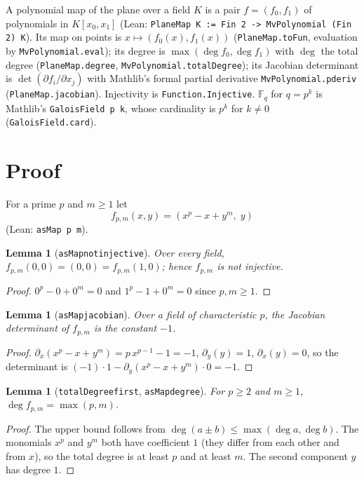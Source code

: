\documentclass[11pt]{article}
\renewcommand{\_}{\oldus\allowbreak}
\newtheorem{lemma}[theorem]{Lemma}
\theoremstyle{definition}
\theoremstyle{remark}
\newcommand{\F}{\mathbb{F}}
\begin{document}
A polynomial map of the plane over a field $K$ is a pair $f=(f_0,f_1)$ of polynomials in
$K[x_0,x_1]$ (Lean: \texttt{PlaneMap K := Fin 2 -> MvPolynomial (Fin 2) K}). Its map on points is
$x\mapsto(f_0(x),f_1(x))$ (\texttt{PlaneMap.toFun}, evaluation by \texttt{MvPolynomial.eval}); its
degree is $\max(\deg f_0,\deg f_1)$ with $\deg$ the total degree (\texttt{PlaneMap.degree},
\texttt{MvPolynomial.totalDegree}); its Jacobian determinant is
$\det(\partial f_i/\partial x_j)$ with Mathlib's formal partial derivative
\texttt{MvPolynomial.pderiv} (\texttt{PlaneMap.jacobian}). Injectivity is
\texttt{Function.Injective}. $\F_q$ for $q=p^k$ is Mathlib's \texttt{GaloisField p k}, whose
cardinality is $p^k$ for $k\ne0$ (\texttt{GaloisField.card}).

\section{Proof}

For a prime $p$ and $m\ge1$ let
\[
  f_{p,m}(x,y) = (x^p - x + y^m,\; y)
\]
(Lean: \texttt{asMap p m}).

\begin{lemma}[\texttt{asMap\_not\_injective}]
Over every field, $f_{p,m}(0,0)=(0,0)=f_{p,m}(1,0)$; hence $f_{p,m}$ is not injective.
\end{lemma}
\begin{proof}
$0^p-0+0^m=0$ and $1^p-1+0^m=0$ since $p,m\ge1$.
\end{proof}

\begin{lemma}[\texttt{asMap\_jacobian}]
Over a field of characteristic $p$, the Jacobian determinant of $f_{p,m}$ is the constant $-1$.
\end{lemma}
\begin{proof}
$\partial_x(x^p-x+y^m)=p\,x^{p-1}-1=-1$, $\partial_y(y)=1$, $\partial_x(y)=0$, so the
determinant is $(-1)\cdot1-\partial_y(x^p-x+y^m)\cdot 0=-1$.
\end{proof}

\begin{lemma}[\texttt{totalDegree\_first}, \texttt{asMap\_degree}]
For $p\ge2$ and $m\ge1$, $\deg f_{p,m}=\max(p,m)$.
\end{lemma}
\begin{proof}
The upper bound follows from $\deg(a\pm b)\le\max(\deg a,\deg b)$. The monomials $x^p$ and $y^m$
both have coefficient $1$ (they differ from each other and from $x$), so the total degree is at
least $p$ and at least $m$. The second component $y$ has degree $1$.
\end{proof}
\end{document}
